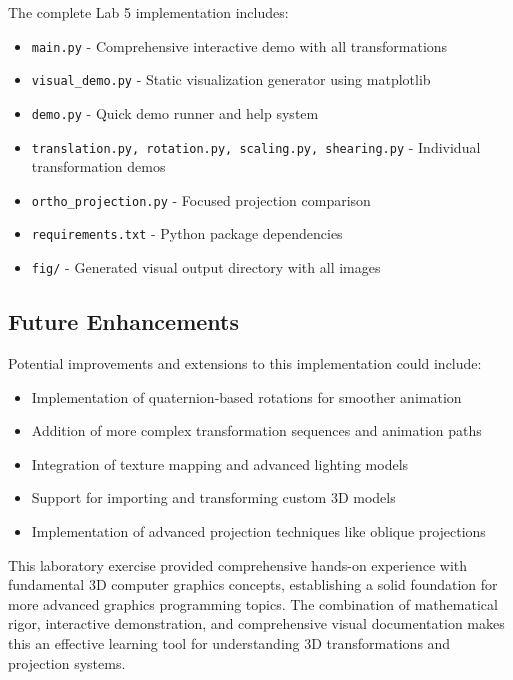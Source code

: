 \documentclass[12pt,a4paper]{article}
\begin{document}
The complete Lab 5 implementation includes:

\begin{itemize}
    \item \texttt{main.py} - Comprehensive interactive demo with all transformations
    \item \texttt{visual\_demo.py} - Static visualization generator using matplotlib
    \item \texttt{demo.py} - Quick demo runner and help system
    \item \texttt{translation.py, rotation.py, scaling.py, shearing.py} - Individual transformation demos
    \item \texttt{ortho\_projection.py} - Focused projection comparison
    \item \texttt{requirements.txt} - Python package dependencies
    \item \texttt{fig/} - Generated visual output directory with all images
\end{itemize}

\subsection{Future Enhancements}

Potential improvements and extensions to this implementation could include:

\begin{itemize}
    \item Implementation of quaternion-based rotations for smoother animation
    \item Addition of more complex transformation sequences and animation paths
    \item Integration of texture mapping and advanced lighting models
    \item Support for importing and transforming custom 3D models
    \item Implementation of advanced projection techniques like oblique projections
\end{itemize}

This laboratory exercise provided comprehensive hands-on experience with fundamental 3D computer graphics concepts, establishing a solid foundation for more advanced graphics programming topics. The combination of mathematical rigor, interactive demonstration, and comprehensive visual documentation makes this an effective learning tool for understanding 3D transformations and projection systems.
\end{document}
